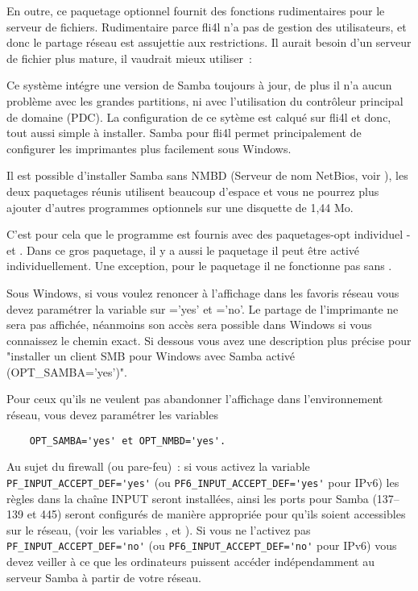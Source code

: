     En outre, ce paquetage optionnel fournit des fonctions rudimentaires pour
    le serveur de fichiers. Rudimentaire parce fli4l n'a pas de gestion des
    utilisateurs, et donc le partage réseau est assujettie aux restrictions. Il
    aurait besoin d'un serveur de fichier plus mature, il vaudrait mieux utiliser~:


    Ce système intégre une version de Samba toujours à jour, de plus il n'a aucun
    problème avec les grandes partitions, ni avec l'utilisation du contrôleur
    principal de domaine (PDC). La configuration de ce sytème est calqué sur
    fli4l et donc, tout aussi simple à installer. Samba pour fli4l permet
    principalement de configurer les imprimantes plus facilement sous Windows.

    Il est possible d'installer Samba sans NMBD (Serveur de nom NetBios,
    voir ), les deux paquetages réunis
    utilisent beaucoup d'espace et vous ne pourrez plus ajouter d'autres programmes
    optionnels sur une disquette de 1,44 Mo.

    C'est pour cela que le programme est fournis avec des paquetages-opt
    individuel -  et .
    Dans ce gros paquetage, il y a aussi le paquetage 
    il peut être activé individuellement. Une exception, pour le paquetage
     il ne fonctionne pas sans .

    Sous Windows, si vous voulez renoncer à l'affichage dans les favoris réseau vous
    devez paramétrer la variable sur ='yes' et ='no'.
    Le partage de l'imprimante ne sera pas affichée, néanmoins son accès sera
    possible dans Windows si vous connaissez le chemin exact. Si dessous vous
    avez une description plus précise pour "installer un client SMB pour Windows
    avec Samba activé (OPT\_SAMBA='yes')".

    Pour ceux qu'ils ne veulent pas abandonner l'affichage dans l'environnement
    réseau, vous devez paramétrer les variables
\begin{example}
\begin{verbatim}
    OPT_SAMBA='yes' et OPT_NMBD='yes'.
\end{verbatim}
\end{example}

	Au sujet du firewall (ou pare-feu)~: si vous activez la variable
	\verb+PF_INPUT_ACCEPT_DEF='yes'+ (ou \verb+PF6_INPUT_ACCEPT_DEF='yes'+ pour IPv6)
	les règles dans la chaîne INPUT seront installées, ainsi les ports pour Samba
	(137--139 et 445) seront configurés de manière appropriée pour qu'ils soient
	accessibles sur le réseau, (voir les variables ,
	 et
	). Si vous ne l'activez pas
	\verb+PF_INPUT_ACCEPT_DEF='no'+ (ou \verb+PF6_INPUT_ACCEPT_DEF='no'+ pour IPv6)
	vous devez veiller à ce que les ordinateurs puissent accéder indépendamment au
	serveur Samba à partir de votre réseau.


